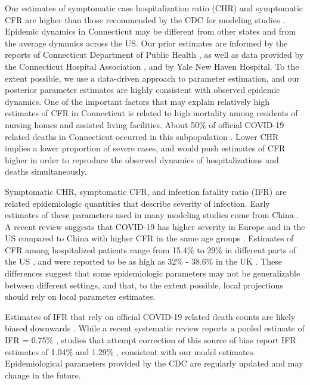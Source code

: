 \documentclass[11pt]{article}
\begin{document}
Our estimates of symptomatic case hospitalization ratio (CHR) and symptomatic CFR are higher than those recommended by the CDC for modeling studies \citep{cdc2020scenarios}. 
Epidemic dynamics in Connecticut may be different from other states and from the average dynamics across the US. Our prior estimates are informed by the reports of Connecticut Department of Public Health \citep{DPHwebsite, DPHwebsitenursing}, as well as data provided by the Connecticut Hospital Association \citep{CHAwebsite}, and by Yale New Haven Hospital. To the extent possible, we use a data-driven approach to parameter estimation, and our posterior parameter estimates are highly consistent with observed epidemic dynamics. One of the important factors that may explain relatively high estimates of CFR in Connecticut is related to high mortality among residents of nursing homes and assisted living facilities. About 50\% of official COVID-19 related deaths in Connecticut occurred in this subpopulation \citep{DPHwebsitenursing}. 
Lower CHR implies a lower proportion of severe cases, and would push estimates of CFR higher in order to reproduce the observed dynamics of hospitalizations and deaths simultaneously.  

Symptomatic CHR, symptomatic CFR, and infection fatality ratio (IFR) are related epidemiologic quantities that describe severity of infection. Early estimates of these parameters used in many modeling studies come from China \citep{verity2020estimates, wu2020estimating, bi2020epidemiology}.
A recent review suggests that COVID-19 has higher severity in Europe and in the US compared to China \citep{lane2020country} with higher CFR in the same age groups \citep{onder2020case}. Estimates of CFR among hospitalized patients range from 15.4\% to 29\% in different parts of the US \citep{lewnard2020incidence, paranjpe2020clinical, lane2020country}, and were reported to be as high as 32\% - 38.6\% in the UK \citep{perez2020clinical, docherty2020features}. These differences suggest that some epidemiologic parameters may not be generalizable between different settings, and that, to the extent possible, local projections should rely on local parameter estimates.

Estimates of IFR that rely on official COVID-19 related death counts are likely biased downwards \citep{weinberger2020estimating}. While a recent systematic review reports a pooled estimate of IFR = 0.75\% \citep{meyerowitz2020systematic}, studies that attempt correction of this source of bias report IFR estimates of 1.04\% \citep{grewelle2020estimating} and 1.29\% \citep{rinaldi2020empirical}, consistent with our model estimates. Epidemiological parameters provided by the CDC are regularly updated and may change in the future.
\end{document}
